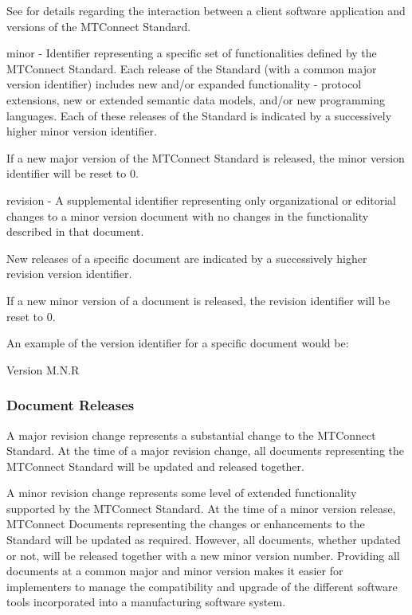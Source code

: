 \documentclass{mtconnect}	%
\begin{document}
See  for details regarding the interaction between a client software application and versions of the MTConnect Standard.

\gls{minor} - Identifier representing a specific set of functionalities defined by the MTConnect Standard.  Each release of the Standard (with a common \gls{major} version identifier) includes new and/or expanded functionality - protocol extensions, new or extended \glspl{semantic data model}, and/or new programming languages.  Each of these releases of the Standard is indicated by a successively higher \gls{minor} version identifier.   

If a new \gls{major} version of the MTConnect Standard is released, the \gls{minor} version identifier will be reset to 0.

\gls{revision} - A supplemental identifier representing only organizational or editorial changes to a \gls{minor} version document with no changes in the functionality described in that document.

New releases of a specific document are indicated by a successively higher revision version identifier.

If a new \gls{minor} version of a document is released, the \gls{revision} identifier will be reset to 0.

An example of the version identifier for a specific document would be: 

\centerline{Version M.N.R}

\subsubsection{Document Releases}

A \gls{major} revision change represents a substantial change to the MTConnect Standard.  At the time of a \gls{major} revision change, all documents representing the MTConnect Standard will be updated and released together.

A \gls{minor} revision change represents some level of extended functionality supported by the MTConnect Standard.  At the time of a \gls{minor} version release, MTConnect Documents representing the changes or enhancements to the Standard will be updated as required. However, all documents, whether updated or not, will be released together with a new \gls{minor} version number.  Providing all documents at a common \gls{major} and \gls{minor} version makes it easier for implementers to manage the compatibility and upgrade of the different software tools incorporated into a manufacturing software system.
\end{document}
